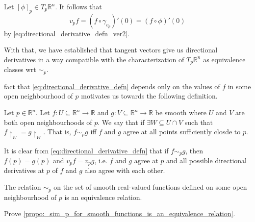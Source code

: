 \documentclass[notoc,notitlepage]{tufte-book}
\begin{document}
\begin{crly}\label{crly:justification_for_the_notation_v_p_f_}
  Let $[\phi]_p \in T_p \mathbb{R}^n$. It follows that
  \begin{equation*}
    v_p f = (f \circ \gamma_{v_p})'(0) = (f \circ \phi)'(0)
  \end{equation*}
  by \cref{eq:directional_derivative_defn_ver2}.
\end{crly}

\begin{remark}
  With that, we have established that tangent vectors give us directional derivatives
  in a way compatible with the characterization of $T_p \mathbb{R}^n$ as equivalence
  classes wrt $\sim_p$.
\end{remark}

 fact that \cref{eq:directional_derivative_defn} depends only on
the values of $f$ in some open neighbourhood of $p$ motivates us towards the following
definition.

\begin{defn}[$f \sim_p g$]\label{defn:_f_sim_p_g_}
  Let $p \in \mathbb{R}^n$. Let $f : U \subseteq \mathbb{R}^n \to \mathbb{R}$ and
  $g : V \subseteq \mathbb{R}^n \to \mathbb{R}$ be smooth where $U$ and $V$ are
  both open neighbourhoods of $p$. We say that  if $\exists W
  \subseteq U \cap V$ such that $f \restriction_W = g \restriction_W$. That is,
  $f \sim_p g$ iff $f$ and $g$ agree at all points sufficiently closde to $p$.
\end{defn}

\begin{note}
  It is clear from \cref{eq:directional_derivative_defn} that if $f \sim_p g$, then
  $f(p) = g(p)$ and $v_p f = v_p g$, i.e. $f$ and $g$ agree at $p$ and all possible
  directional derivatives at $p$ of $f$ and $g$ also agree with each other.
\end{note}

\begin{propo}\label{propo:_sim_p_for_smooth_functions_is_an_equivalence_relation}
  The relation $\sim_p$ on the set of smooth real-valued functions defined on some
  open neighbourhood of $p$ is an equivalence relation.
\end{propo}

\begin{ex}
  Prove \cref{propo:_sim_p_for_smooth_functions_is_an_equivalence_relation}.
\end{ex}
\end{document}
